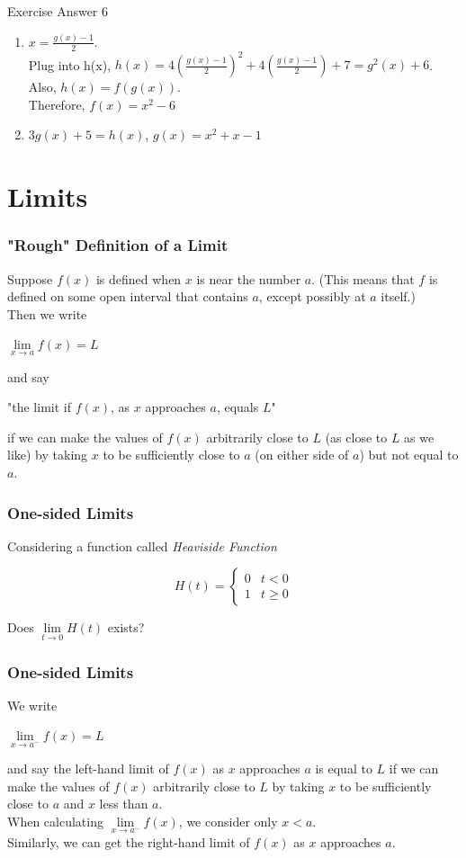 \documentclass{beamer}
\begin{document}
\begin{frame}{Exercise Answer 6}
    \begin{enumerate}
        \item $x=\frac{g(x)-1}{2}$.\\
        Plug into h(x), $h(x)=4(\frac{g(x)-1}{2})^2+4(\frac{g(x)-1}{2})+7=g^2(x)+6$.\\
        Also, $h(x)=f(g(x))$.\\
        Therefore, $f(x)=x^2-6$
        \item $3g(x)+5=h(x)$, $g(x)=x^2+x-1$
    \end{enumerate}
\end{frame}

\section{Limits}
    \begin{frame}
		\frametitle{"Rough" Definition of a Limit}
		Suppose $f(x)$ is defined when $x$ is near the number $a$. (This means that $f$ is defined on some open interval that contains $a$, \alert{except possibly} at $a$ itself.)\\
		Then we write
		\begin{center}
			$\lim\limits_{\textit{x} \to a}f(x) = L$
		\end{center}
		and say
		\begin{center}
			"the limit if $f(x)$, as $x$ approaches $a$, equals $L$"
		\end{center}
		if we can make the values of $f(x)$ arbitrarily close to $L$ (as close to $L$ as we like) by taking $x$ to be \alert{sufficiently close to} $a$ (on either side of $a$) but \alert{not equal to} $a$.
	\end{frame}
	\begin{frame}
		\frametitle{One-sided Limits}
		Considering a function called \textit{Heaviside Function}\\
		\begin{center}
			\begin{equation}
				H(t)=
				\begin{cases}
					0 & t<0\\
					1 & t \geq 0
				\end{cases}
			\end{equation}
		\end{center}
		Does $\lim\limits_{\textit{t} \to 0}H(t)$ exists?
	\end{frame}
	\begin{frame}
		\frametitle{One-sided Limits}
		We write
		\begin{center}
			$\lim\limits_{\textit{x} \to a^{-}}f(x) = L$
		\end{center}
		and say the left-hand limit of $f(x)$ as $x$ approaches $a$ is equal to $L$ if we can make the values of $f(x)$ arbitrarily close to $L$ by taking $x$ to be \alert{sufficiently close to} $a$ and $x$ less than $a$.\\
		\bigskip
		When calculating $\lim\limits_{\textit{x} \to a^{-}}f(x)$, we consider only $x < a$.\\
		\bigskip
		Similarly, we can get the right-hand limit of $f(x)$ as $x$ approaches $a$.
	\end{frame}
\end{document}
